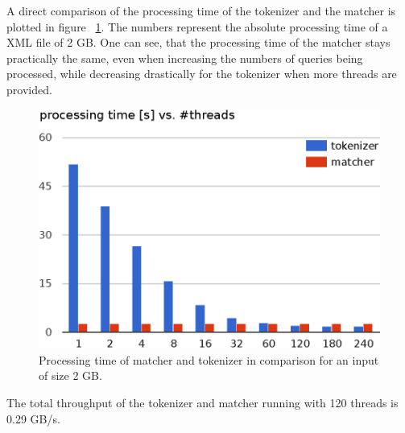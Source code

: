 A direct comparison of the processing time of the tokenizer and the matcher is plotted in figure ~\ref{matcher_tokenizer_pt}. The numbers represent the absolute processing time of a XML file of 2 GB. One can see, that the processing time of the matcher stays practically the same, even when increasing the numbers of queries being processed, while decreasing drastically for the tokenizer when more threads are provided.

\begin{figure}[h]\centering
  \includegraphics[scale=.66]{img/matcher_tokenizer_p_time.eps}
  \caption{Processing time of matcher and tokenizer in comparison for an input of size 2 GB.
  \label{matcher_tokenizer_pt}}
\end{figure}

The total throughput of the tokenizer and matcher running with 120 threads is 0.29 GB/s.
